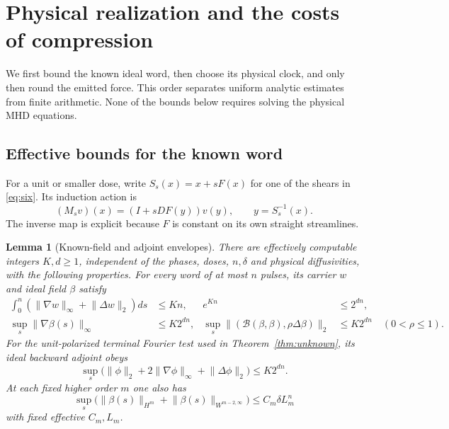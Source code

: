 \documentclass[11pt,a4paper]{amsart}
\newtheorem{lemma}[theorem]{Lemma}
\theoremstyle{definition}
\theoremstyle{remark}
\numberwithin{equation}{section}
\newcommand{\Bcal}{\mathcal B}
\newcommand{\norm}[1]{\lVert #1\rVert}
\begin{document}
\section{Physical realization and the costs of compression}\label{sec:realization}

We first bound the known ideal word, then choose its physical clock, and only then round the emitted force. This order separates uniform analytic estimates from finite arithmetic. None of the bounds below requires solving the physical MHD equations.

\subsection{Effective bounds for the known word}
For a unit or smaller dose, write $S_s(x)=x+sF(x)$ for one of the shears in \eqref{eq:six}. Its induction action is
\begin{equation}\label{eq:onepulsepush}
 (M_sv)(x)=(I+sDF(y))v(y),\qquad y=S_s^{-1}(x).
\end{equation}
The inverse map is explicit because $F$ is constant on its own straight streamlines.

\begin{lemma}[Known-field and adjoint envelopes]\label{lem:wordenvelope}
There are effectively computable integers $K,d\ge1$, independent of the phases, doses, $n,\delta$ and physical diffusivities, with the following properties. For every word of at most $n$ pulses, its carrier $w$ and ideal field $\beta$ satisfy
\begin{align}
 \int_0^n(\norm{\nabla w}_\infty+\norm{\Delta w}_2)ds&\le Kn,
 &e^{Kn}&\le2^{dn},\label{eq:wordstrain}\\
 \sup_s\norm{\nabla\beta(s)}_\infty&\le K2^{dn},
 &\sup_s\norm{(\Bcal(\beta,\beta),\rho\Delta\beta)}_2
       &\le K2^{dn}\quad(0<\rho\le1).\label{eq:wordresidual}
\end{align}
For the unit-polarized terminal Fourier test used in Theorem~\ref{thm:unknown}, its ideal backward adjoint obeys
\begin{equation}\label{eq:adjointenvelope}
 \sup_s\big(\norm\phi_2+2\norm{\nabla\phi}_\infty
                         +\norm{\Delta\phi}_2\big)\le K2^{dn}.
\end{equation}
At each fixed higher order $m$ one also has
\begin{equation}\label{eq:referencebounds}
 \sup_s\big(\norm{\beta(s)}_{H^m}
       +\norm{\beta(s)}_{W^{m-2,\infty}}\big)
 \le C_m\delta L_m^n
\end{equation}
with fixed effective $C_m,L_m$.
\end{lemma}
\end{document}
